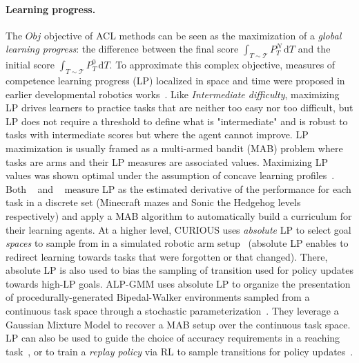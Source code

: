 \documentclass{article}
\newcommand{\mycite}[1]{\citeauthor{#1}~\shortcite{#1}}
\begin{document}
\paragraph{Learning progress.}The $Obj$ objective of ACL methods can be seen as the  maximization of a \textit{global learning progress}: the difference between the final score $\int_{T\sim \mathcal{T}} \! P_T^N\, \mathrm{d}T$ and the initial score $\int_{T\sim \mathcal{T}} \! P_T^0\, \mathrm{d}T$. To approximate this complex objective, measures of competence learning progress (LP) localized in space and time were proposed in earlier developmental robotics works~\cite{baranes2013active,imgep}. Like \textit{Intermediate difficulty}, maximizing LP drives learners to practice tasks that are neither too easy nor too difficult, but LP does not require a threshold to define what is "intermediate" and is robust to tasks with intermediate scores but where the agent cannot improve. 
LP maximization is usually framed as a multi-armed bandit (MAB) problem where tasks are arms and their LP measures are associated values. Maximizing LP values was shown optimal under the assumption of concave learning profiles~\cite{lopes2012strategic}. Both \mycite{tscl} and \mycite{tscllike} measure LP as the estimated derivative of the performance for each task in a discrete set (Minecraft mazes and Sonic the Hedgehog levels respectively) and apply a MAB algorithm to automatically build a curriculum for their learning agents. At a higher level, CURIOUS uses \textit{absolute} LP to select goal \textit{spaces} to sample from in a simulated robotic arm setup~\cite{curious} (absolute LP enables to redirect learning towards tasks that were forgotten or that changed). There, absolute LP is also used to bias the sampling of transition used for policy updates towards high-LP goals. ALP-GMM uses absolute LP to organize the presentation of procedurally-generated Bipedal-Walker environments sampled from a continuous task space through a stochastic parameterization~\cite{portelas2019}. They leverage a Gaussian Mixture Model to recover a MAB setup over the continuous task space. LP can also be used to guide the choice of accuracy requirements in a reaching task~\cite{fournier-accuracy-acl}, or to train a \textit{replay policy} via RL to sample transitions for policy updates~\cite{exp-replay-opti}.
\end{document}
